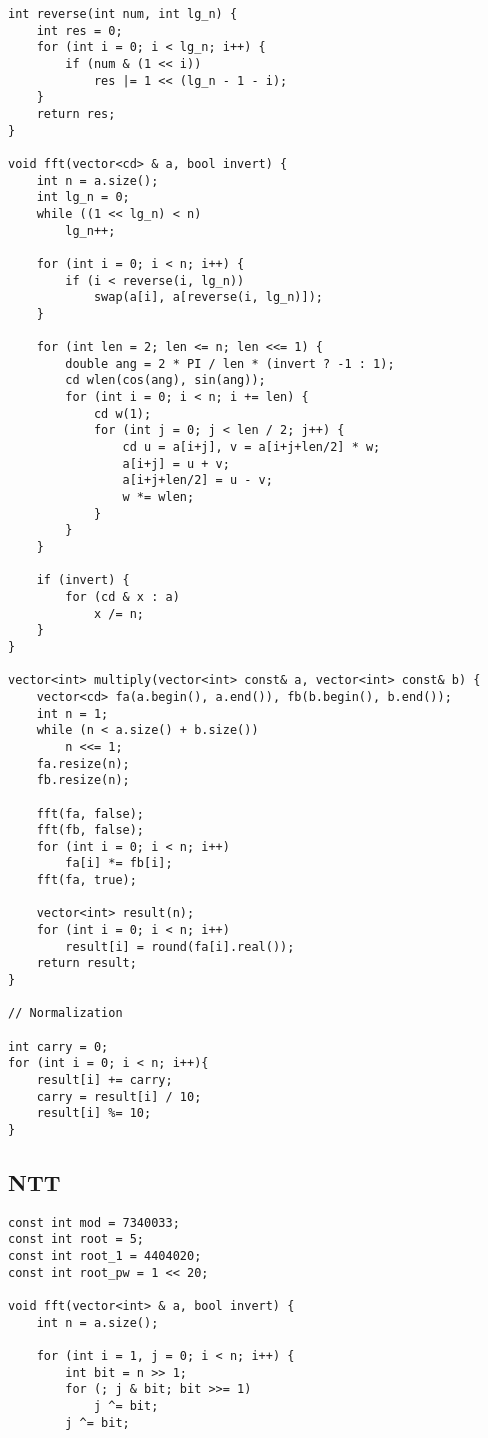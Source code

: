\documentclass[10pt]{article}
\begin{document}
\begin{multicols*}{2}
\begin{lstlisting}[style=compactcpp]
int reverse(int num, int lg_n) {
    int res = 0;
    for (int i = 0; i < lg_n; i++) {
        if (num & (1 << i))
            res |= 1 << (lg_n - 1 - i);
    }
    return res;
}

void fft(vector<cd> & a, bool invert) {
    int n = a.size();
    int lg_n = 0;
    while ((1 << lg_n) < n)
        lg_n++;

    for (int i = 0; i < n; i++) {
        if (i < reverse(i, lg_n))
            swap(a[i], a[reverse(i, lg_n)]);
    }

    for (int len = 2; len <= n; len <<= 1) {
        double ang = 2 * PI / len * (invert ? -1 : 1);
        cd wlen(cos(ang), sin(ang));
        for (int i = 0; i < n; i += len) {
            cd w(1);
            for (int j = 0; j < len / 2; j++) {
                cd u = a[i+j], v = a[i+j+len/2] * w;
                a[i+j] = u + v;
                a[i+j+len/2] = u - v;
                w *= wlen;
            }
        }
    }

    if (invert) {
        for (cd & x : a)
            x /= n;
    }
}

vector<int> multiply(vector<int> const& a, vector<int> const& b) {
    vector<cd> fa(a.begin(), a.end()), fb(b.begin(), b.end());
    int n = 1;
    while (n < a.size() + b.size()) 
        n <<= 1;
    fa.resize(n);
    fb.resize(n);

    fft(fa, false);
    fft(fb, false);
    for (int i = 0; i < n; i++)
        fa[i] *= fb[i];
    fft(fa, true);

    vector<int> result(n);
    for (int i = 0; i < n; i++)
        result[i] = round(fa[i].real());
    return result;
}

// Normalization

int carry = 0;
for (int i = 0; i < n; i++){
    result[i] += carry;
    carry = result[i] / 10;
    result[i] %= 10;
}

\end{lstlisting}

\subsection{NTT}

\begin{lstlisting}[style=compactcpp]
const int mod = 7340033;
const int root = 5;
const int root_1 = 4404020;
const int root_pw = 1 << 20;

void fft(vector<int> & a, bool invert) {
    int n = a.size();

    for (int i = 1, j = 0; i < n; i++) {
        int bit = n >> 1;
        for (; j & bit; bit >>= 1)
            j ^= bit;
        j ^= bit;


\end{lstlisting}
\end{multicols*}
\end{document}
